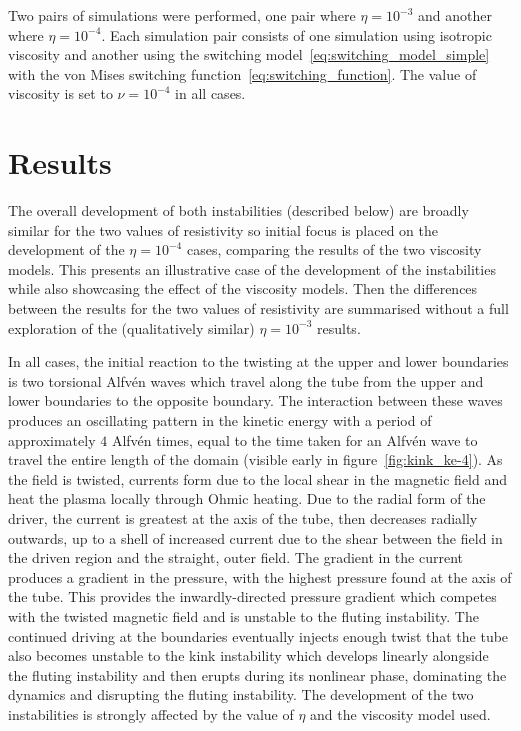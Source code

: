 Two pairs of simulations were performed, one pair where $\eta=10^{-3}$ and another where $\eta=10^{-4}$. Each simulation pair consists of one simulation using isotropic viscosity and another using the switching model~\ref{eq:switching_model_simple} with the von Mises switching function~\ref{eq:switching_function}. The value of viscosity is set to $\nu = 10^{-4}$ in all cases.

\section{Results}

The overall development of both instabilities (described below) are broadly similar for the two values of resistivity so initial focus is placed on the development of the $\eta=10^{-4}$ cases, comparing the results of the two viscosity models. This presents an illustrative case of the development of the instabilities while also showcasing the effect of the viscosity models. Then the differences between the results for the two values of resistivity are summarised without a full exploration of the (qualitatively similar) $\eta=10^{-3}$ results.

In all cases, the initial reaction to the twisting at the upper and lower boundaries is two torsional Alfv\'en waves which travel along the tube from the upper and lower boundaries to the opposite boundary. The interaction between these waves produces an oscillating pattern in the kinetic energy with a period of approximately $4$ Alfv\'en times, equal to the time taken for an Alfv\'en wave to travel the entire length of the domain (visible early in figure~\ref{fig:kink_ke-4}). As the field is twisted, currents form due to the local shear in the magnetic field and heat the plasma locally through Ohmic heating. Due to the radial form of the driver, the current is greatest at the axis of the tube, then decreases radially outwards, up to a shell of increased current due to the shear between the field in the driven region and the straight, outer field. The gradient in the current produces a gradient in the pressure, with the highest pressure found at the axis of the tube. This provides the inwardly-directed pressure gradient which competes with the twisted magnetic field and is unstable to the fluting instability. The continued driving at the boundaries eventually injects enough twist that the tube also becomes unstable to the kink instability which develops linearly alongside the fluting instability and then erupts during its nonlinear phase, dominating the dynamics and disrupting the fluting instability. The development of the two instabilities is strongly affected by the value of $\eta$ and the viscosity model used.

